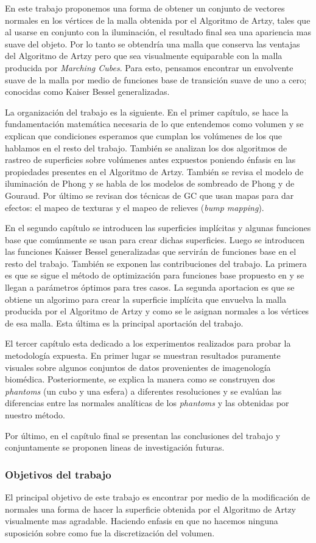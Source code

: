 En este trabajo proponemos una forma de obtener un conjunto de vectores normales en los vértices de la malla obtenida por el Algoritmo de Artzy, tales que al usarse en conjunto con la iluminación, el resultado final sea una apariencia mas suave del objeto. Por lo tanto se obtendría una malla que conserva las ventajas del Algoritmo de Artzy pero que sea visualmente equiparable con la malla producida por \emph{Marching Cubes}. Para esto, pensamos encontrar un envolvente suave de la malla por medio de funciones base de transición suave de uno a cero; conocidas como Kaiser Bessel generalizadas.

La organización del trabajo es la siguiente. En el primer capítulo, se hace la fundamentación matemática necesaria de lo que entendemos como volumen y se explican que condiciones esperamos que cumplan los volúmenes de los que hablamos en el resto del trabajo. También se analizan los dos algoritmos de rastreo de superficies sobre volúmenes antes expuestos poniendo énfasis en las propiedades presentes en el Algoritmo de Artzy. También se revisa el modelo de iluminación de Phong y se habla de los modelos de sombreado de Phong y de Gouraud. Por último se revisan dos técnicas de GC que usan mapas para dar efectos: el mapeo de texturas y el mapeo de relieves (\emph{bump mapping}).

En el segundo capítulo se introducen las superficies implícitas y algunas funciones base que comúnmente se usan para crear dichas superficies. Luego se introducen las funciones Kaisser Bessel generalizadas que servirán de funciones base en el resto del trabajo. También se exponen las contribuciones del trabajo. La primera es que se sigue el método de optimización para funciones base propuesto en \cite{EdgarOptimization} y se llegan a parámetros óptimos para tres casos. La segunda aportacion es que se obtiene un algorimo para crear la superficie implícita que envuelva la malla producida por el Algoritmo de Artzy y como se le asignan normales a los vértices de esa malla. Esta última es la principal aportación del trabajo.

El tercer capítulo esta dedicado a los experimentos realizados para probar la metodología expuesta. En primer lugar se muestran resultados puramente visuales sobre algunos conjuntos de datos provenientes de imagenología biomédica. Posteriormente, se explica la manera como se construyen dos \emph{phantoms} (un cubo y una esfera) a diferentes resoluciones y se evalúan las diferencias entre las normales analíticas de los \emph{phantoms} y las obtenidas por nuestro método.

Por último, en el capítulo final se presentan las conclusiones del trabajo y conjuntamente se proponen lineas de investigación futuras.

\subsubsection*{Objetivos del trabajo}

El principal objetivo de este trabajo es encontrar por medio de la modificación de normales una forma de hacer la superficie obtenida por el Algoritmo de Artzy visualmente mas agradable. Haciendo enfasis en que no hacemos ninguna suposición sobre como fue la discretización del volumen.
